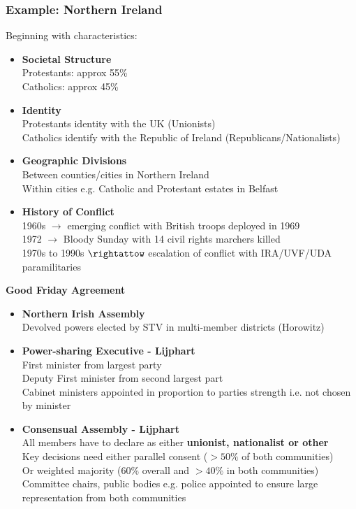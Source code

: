 \documentclass[12pt, letterpaper]{article}
\begin{document}
\subsubsection{Example: Northern Ireland}
Beginning with characteristics:
\begin{itemize}
	\item \textbf{Societal Structure}\\
		Protestants: approx 55\%\\
		Catholics: approx 45\%
	\item \textbf{Identity}\\
		Protestants identity with the UK (Unionists)\\
		Catholics identify with the Republic of Ireland (Republicans/Nationalists)
	\item \textbf{Geographic Divisions}\\
		Between counties/cities in Northern Ireland\\
		Within cities e.g. Catholic and Protestant estates in Belfast
	\item \textbf{History of Conflict}\\
		1960s $\rightarrow$ emerging conflict with British troops deployed in 1969\\
		1972 $\rightarrow$ Bloody Sunday with 14 civil rights marchers killed\\
		1970s to 1990s $\rightattow$ escalation of conflict with IRA/UVF/UDA paramilitaries
\end{itemize}
\textbf{Good Friday Agreement}
\begin{itemize}
	\item \textbf{Northern Irish Assembly}\\
		Devolved powers elected by STV in multi-member districts (Horowitz)
	\item \textbf{Power-sharing Executive - Lijphart}\\
		First minister from largest party\\
		Deputy First minister from second largest part\\
		Cabinet ministers appointed in proportion to parties strength i.e. not chosen by minister
	\item \textbf{Consensual Assembly - Lijphart}\\
		All members have to declare as either \textbf{unionist, nationalist or other}\\
		Key decisions need either parallel consent ($>50\%$ of both communities)\\
		Or weighted majority (60\% overall and $>40\%$ in both communities)\\
		Committee chairs, public bodies e.g. police appointed to ensure large representation from both communities
\end{itemize}
\end{document}
